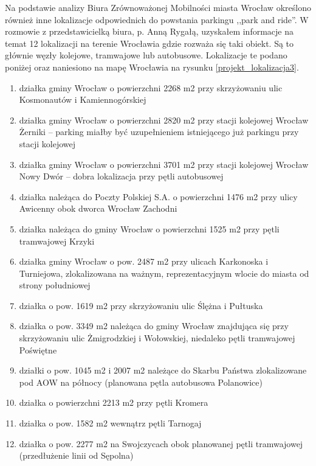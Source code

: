 \documentclass[twoside,12pt]{article}
\begin{document}
	Na podstawie analizy Biura Zrównoważonej Mobilności miasta Wrocław określono również inne lokalizacje odpowiednich do powstania parkingu ,,park and ride''. W rozmowie z przedstawicielką biura, p. Anną Rygałą, uzyskałem informacje na temat 12 lokalizacji na terenie Wrocławia gdzie rozważa się taki obiekt. Są to głównie węzły kolejowe, tramwajowe lub autobusowe. Lokalizacje te podano poniżej oraz naniesiono na mapę Wrocławia na rysunku \ref{projekt_lokalizacja3}.
	\begin{enumerate} \setlength\itemsep{0em}
	\item działka gminy Wrocław o powierzchni 2268 m2 przy skrzyżowaniu ulic Kosmonautów i Kamiennogórskiej
	\item działka gminy Wrocław o powierzchni 2820 m2 przy stacji kolejowej Wrocław Żerniki -- parking miałby być uzupełnieniem istniejącego już parkingu przy stacji kolejowej
	\item działka gminy Wrocław o powierzchni 3701 m2 przy stacji kolejowej Wrocław Nowy Dwór -- dobra lokalizacja przy pętli autobusowej 
	\item działka należąca do Poczty Polskiej S.A. o powierzchni 1476 m2 przy ulicy Awicenny obok dworca Wrocław Zachodni
	\item działka należąca do gminy Wrocław o powierzchni 1525 m2 przy pętli tramwajowej Krzyki 
	\item działka gminy Wrocław o pow. 2487 m2 przy ulicach Karkonoska i Turniejowa, zlokalizowana na ważnym, reprezentacyjnym wlocie do miasta od strony południowej
	\item działka o pow. 1619 m2 przy skrzyżowaniu ulic Ślężna i Pułtuska
	\item działka o pow. 3349 m2 należąca do gminy Wrocław znajdująca się przy skrzyżowaniu ulic Żmigrodzkiej i Wołowskiej, niedaleko pętli tramwajowej Poświętne
	\item działki o pow. 1045 m2 i 2007 m2 należące do Skarbu Państwa zlokalizowane pod AOW na północy (planowana pętla autobusowa Polanowice) 
	\item działka o powierzchni 2213 m2 przy pętli Kromera 
	\item działka o pow. 1582 m2 wewnątrz pętli Tarnogaj 
	\item działka o pow. 2277 m2 na Swojczycach obok planowanej pętli tramwajowej (przedłużenie linii od Sępolna)
	\end{enumerate}
	
\end{document}
